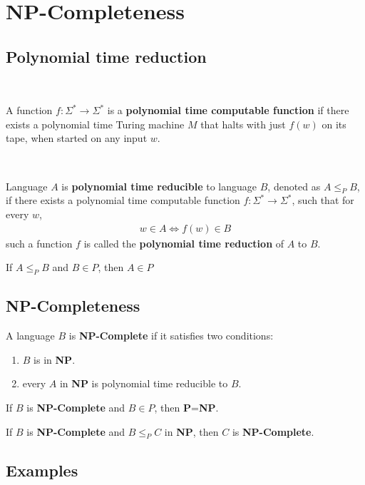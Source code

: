 \setcounter{chapter}{1}
\chapter{NP-Completeness}


\section{Polynomial time reduction} \label{sec:}

\begin{definition} ~ 

A function $f: \Sigma^{*} \to \Sigma^{*}$ is a \textbf{polynomial time computable function} if there exists a polynomial time Turing machine $M$ that halts with just $f(w)$ on its tape, when started on any input $w$.
\end{definition}

\begin{definition} ~ 

Language $A$ is \textbf{polynomial time reducible} to language $B$, denoted as $A\le_P B$, if there exists a polynomial time computable function $f: \Sigma^{*} \to \Sigma^{*}$, such that for every $w$,
\begin{align}
    w \in A \iff f(w) \in B
\end{align}
such a function $f$ is called the \textbf{polynomial time reduction} of $A$ to $B$.
\end{definition}

\begin{prop}
If $A \le_P B$ and $B \in P$, then $A \in P$
\end{prop}

\section{NP-Completeness} \label{sec:}

\begin{definition}[NP-Complete]
A language $B$ is \textbf{NP-Complete} if it satisfies two conditions:
\begin{enumerate}
    \item $B$ is in \textbf{NP}.
    \item every $A$ in \textbf{NP} is polynomial time reducible to $B$.
\end{enumerate}
\end{definition}

\begin{prop}
    If $B$ is \textbf{NP-Complete} and $B \in P$, then \textbf{P}=\textbf{NP}. 
\end{prop}

\begin{prop}
    If $B$ is \textbf{NP-Complete} and $B\le_{P} C$ in \textbf{NP}, then $C$ is \textbf{NP-Complete}.
\end{prop}


\section{Examples} \label{sec:}



